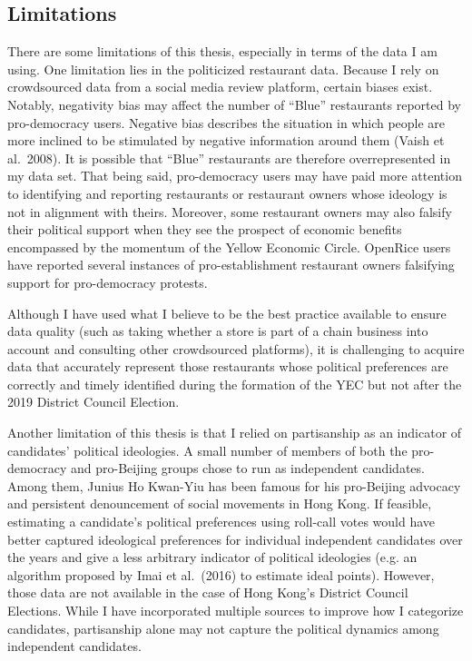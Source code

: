 \documentclass[letterpaper, 12pt]{article}
\begin{document}
\subsection{Limitations}
There are some limitations of this thesis, especially in terms of the data I am using. One limitation lies in the politicized restaurant data. Because I rely on crowdsourced data from a social media review platform, certain biases exist. Notably, negativity bias may affect the number of ``Blue'' restaurants reported by pro-democracy users. Negative bias describes the situation in which people are more inclined to be stimulated by negative information around them (Vaish et al.\ 2008). It is possible that ``Blue'' restaurants are therefore overrepresented in my data set. That being said, pro-democracy users may have paid more attention to identifying and reporting restaurants or restaurant owners whose ideology is not in alignment with theirs. Moreover, some restaurant owners may also falsify their political support when they see the prospect of economic benefits encompassed by the momentum of the Yellow Economic Circle. OpenRice users have reported several instances of pro-establishment restaurant owners falsifying support for pro-democracy protests.


Although I have used what I believe to be the best practice available to ensure data quality (such as taking whether a store is part of a chain business into account and consulting other crowdsourced platforms), it is challenging to acquire data that accurately represent those restaurants whose political preferences are correctly and timely identified during the formation of the YEC but not after the 2019 District Council Election. 

Another limitation of this thesis is that I relied on partisanship as an indicator of candidates' political ideologies. A small number of members of both the pro-democracy and pro-Beijing groups chose to run as independent candidates. Among them, Junius Ho Kwan-Yiu has been famous for his pro-Beijing advocacy and persistent denouncement of social movements in Hong Kong. If feasible, estimating a candidate's political preferences using roll-call votes would have better captured ideological preferences for individual independent candidates over the years and give a less arbitrary indicator of political ideologies (e.g. an algorithm proposed by Imai et al.\ (2016) to estimate ideal points). However, those data are not available in the case of Hong Kong's District Council Elections. While I have incorporated multiple sources to improve how I categorize candidates, partisanship alone may not capture the political dynamics among independent candidates.
\end{document}
